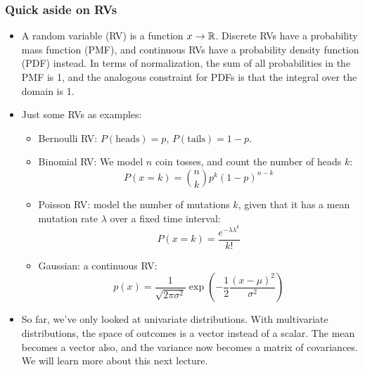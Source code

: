 \subsubsection{Quick aside on RVs}
\begin{itemize}
	\item A random variable (RV) is a function \( x \to \mathbb R \). Discrete RVs have a
		probability mass function (PMF), and continuous RVs have a probability
		density function (PDF) instead. In terms of normalization, the sum of all
		probabilities in the PMF is 1, and the analogous constraint for PDFs is that
		the integral over the domain is 1. 
	\item Just some RVs as examples: 
		\begin{itemize}
			\item Bernoulli RV: \( P(\text{heads}) = p \), \( P(\text{tails}) = 1 - p
				\). 
			\item Binomial RV: We model \( n \) coin tosses, and count the number of
				heads \( k \):
				\[
					P(x = k) = {n \choose k} p^{k} (1 - p)^{n - k}
				\]
			\item Poisson RV: model the number of mutations \( k \), given that it
				has a mean mutation rate \( \lambda \) over a fixed time interval:
				\[
					P(x = k) = \frac{e^{-\lambda \lambda^{k}}}{k!}
				\]
			\item Gaussian: a continuous RV:
				\[
					p(x) = \frac{1}{\sqrt{2\pi\sigma^2}} \exp\left(
					-\frac{1}{2}\frac{(x - \mu)^2}{\sigma^2} \right)
				\]
		\end{itemize}
	\item So far, we've only looked at univariate distributions. With multivariate
		distributions, the space of outcomes is a vector instead of a scalar. The
		mean becomes a vector also, and the variance now becomes a matrix of
		covariances. We will learn more about this next lecture. 
\end{itemize}

